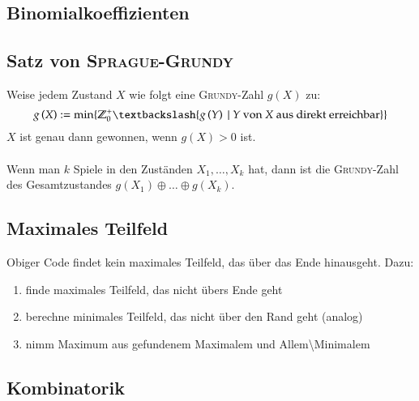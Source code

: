 \subsection{Binomialkoeffizienten}


\subsection{Satz von \textsc{Sprague-Grundy}}
Weise jedem Zustand $X$ wie folgt eine \textsc{Grundy}-Zahl $g\left(X\right)$ zu:
\[
	g\left(X\right) := \min\{ \mathbb{Z}_0^+ \textbackslash \{g\left(Y\right)~|~Y \text{ von } X \text{ aus direkt erreichbar}\}\} 
\]
$X$ ist genau dann gewonnen, wenn $g\left(X\right) > 0$ ist.\\\\
Wenn man $k$ Spiele in den Zuständen $X_1, \ldots, X_k$ hat, dann ist die \textsc{Grundy}-Zahl des Gesamtzustandes $g\left(X_1\right) \oplus \ldots \oplus g\left(X_k\right)$.


\subsection{Maximales Teilfeld}

Obiger Code findet kein maximales Teilfeld, das über das Ende hinausgeht. Dazu:
\begin{enumerate}
	\item finde maximales Teilfeld, das nicht übers Ende geht
	\item berechne minimales Teilfeld, das nicht über den Rand geht (analog)
	\item nimm Maximum aus gefundenem Maximalem und Allem\textbackslash Minimalem
\end{enumerate}

\subsection{Kombinatorik}

